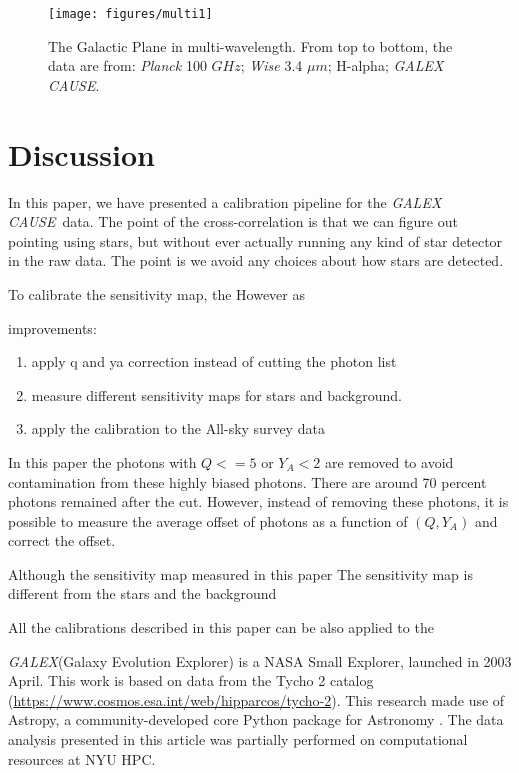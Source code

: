\documentclass[12pt, preprint]{aastex}
\newcommand{\project}[1]{\textsl{#1}}
\newcommand{\galex}{\project{GALEX}}
\newcommand{\cause}{\project{GALEX CAUSE}}
\begin{document}
\begin{figure}[p]
\begin{center}
\texttt{[image: figures/multi1]}
\end{center}
\caption{
  \label{map4}
  The Galactic Plane in multi-wavelength. From top to bottom, the data are from:
  \project{Planck} 100 $GHz$; \project{Wise} 3.4 $\mu m$; H-alpha; \cause.
}
\end{figure}

\section{Discussion}
\label{ds}

In this paper, we have presented a calibration pipeline for the \cause\ data.
The point of the cross-correlation is that we can figure out pointing using stars, but without ever actually running any kind of star detector in the raw data. 
The point is we avoid any choices about how stars are detected.

To calibrate the sensitivity map, the 
However as 


improvements:
\begin{enumerate}
\item apply q and ya correction instead of cutting the photon list
\item measure different sensitivity maps for stars and background.
\item apply the calibration to the All-sky survey data
\end{enumerate}

In this paper the photons with $Q<=5$ or $Y_A<2$ are removed to avoid contamination from these highly biased photons.
There are around 70 percent photons remained after the cut.
However, instead of removing these photons, it is possible to measure the average offset of photons as a function of $(Q, Y_A)$ and correct the offset.

Although the sensitivity map measured in this paper 
The sensitivity map is different from the stars and the background

All the calibrations described in this paper can be also applied to the 


\acknowledgements
\galex (Galaxy Evolution Explorer) is a NASA Small Explorer, launched in 2003 April.
This work is based on data from the Tycho 2 catalog (\url{https://www.cosmos.esa.int/web/hipparcos/tycho-2}).
This research made use of Astropy, a community-developed core Python package for Astronomy \citep{astropy}.
The data analysis presented in this article was partially performed on computational resources at NYU HPC.

\clearpage

\clearpage
\end{document}

